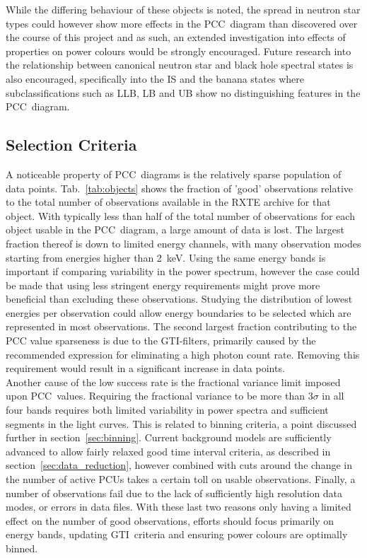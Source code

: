 While the differing behaviour of these objects is noted, the spread in neutron star types could however show more effects in the \ac{PCC}~diagram than discovered over the course of this project and as such, an extended investigation into effects of properties on power colours would be strongly encouraged. Future research into the relationship between canonical neutron star and black hole spectral states is also encouraged, specifically into the \ac{IS} and the banana states where subclassifications such as \ac{LLB}, \ac{LB} and \ac{UB} show no distinguishing features in the \ac{PCC}~diagram.\\

\subsection{Selection Criteria}
\label{sec:selection_criteria}
A noticeable property of \ac{PCC}~diagrams is the relatively sparse population of data points. Tab.~\ref{tab:objects} shows the fraction of 'good' observations relative to the total number of observations available in the \ac{RXTE} archive for that object. With typically less than half of the total number of observations for each object usable in the \ac{PCC}~diagram, a large amount of data is lost. The largest fraction thereof is down to limited energy channels, with many observation modes starting from energies higher than 2~keV. Using the same energy bands is important if comparing variability in the power spectrum, however the case could be made that using less stringent energy requirements might prove more beneficial than excluding these observations. Studying the distribution of lowest energies per observation could allow energy boundaries to be selected which are represented in most observations. The second largest fraction contributing to the \ac{PCC} value sparseness is due to the \ac{GTI}-filters, primarily caused by the recommended expression for eliminating a high photon count rate. Removing this requirement would result in a significant increase in data points. \\

Another cause of the low success rate is the fractional variance limit imposed upon \ac{PCC}~values. Requiring the fractional variance to be more than $3\sigma$ in all four bands requires both limited variability in power spectra and sufficient segments in the light curves. This is related to binning criteria, a point discussed further in section~\ref{sec:binning}. Current background models are sufficiently advanced to allow fairly relaxed good time interval criteria, as described in section~\ref{sec:data_reduction}, however combined with cuts around the change in the number of active \acp{PCU} takes a certain toll on usable observations. Finally, a number of observations fail due to the lack of sufficiently high resolution data modes, or errors in data files. With these last two reasons only having a limited effect on the number of good observations, efforts should focus primarily on energy bands, updating \ac{GTI}~criteria and ensuring power colours are optimally binned.

